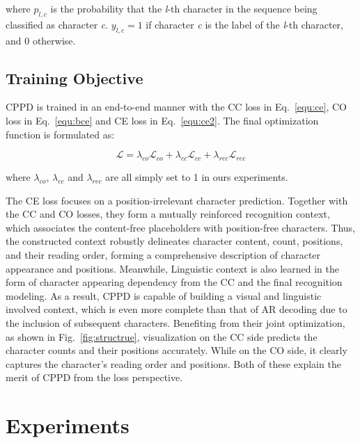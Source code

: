 \documentclass[10pt,journal,compsoc]{IEEEtran}
\begin{document}
\noindent where $p_{l,c}$ is the probability that the \emph{l}-th character in the sequence being classified as character \emph{c}. $y_{l,c}=1$ if character \emph{c} is the label of the \emph{l}-th character, and 0 otherwise. 



\subsection{Training Objective}

CPPD is trained in an end-to-end manner with the CC loss in Eq.~\ref{equ:ce}, CO loss in Eq.~\ref{equ:bce} and CE loss in Eq.~\ref{equ:ce2}. The final optimization function is formulated as:

\begin{equation}
    \mathcal{L} = \lambda_{co}\mathcal{L}_{co} + \lambda_{cc}\mathcal{L}_{cc}+ \lambda_{rec}\mathcal{L}_{rec}
\label{eq:all}
\end{equation}

\noindent where $\lambda_{co}$, $\lambda_{cc}$ and $\lambda_{rec}$ are all simply set to 1 in ours experiments. 

The CE loss focuses on a position-irrelevant character prediction. Together with the CC and CO losses, they form a mutually reinforced recognition context, which associates the content-free placeholders with position-free characters. Thus, the constructed context robustly delineates character content, count, positions, and their reading order, forming a comprehensive description of character appearance and positions. Meanwhile, Linguistic context is also learned in the form of character appearing dependency from the CC and the final recognition modeling. As a result, CPPD is capable of building a visual and linguistic involved context, which is even more complete than that of AR decoding due to the inclusion of subsequent characters. Benefiting from their joint optimization, as shown in Fig.~\ref{fig:structrue}, visualization on the CC side predicts the character counts and their positions accurately. While on the CO side, it clearly captures the character's reading order and positions. Both of these explain the merit of CPPD from the loss perspective. 

\section{Experiments}
\end{document}
